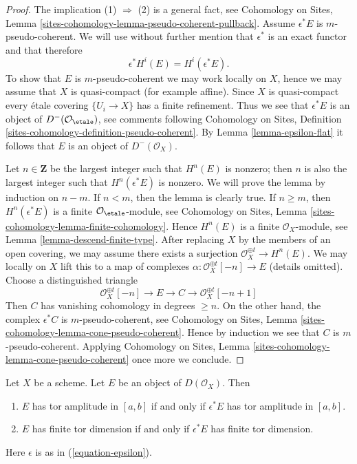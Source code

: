 \begin{proof}
The implication (1) $\Rightarrow$ (2) is a general fact, see
Cohomology on Sites, Lemma
\ref{sites-cohomology-lemma-pseudo-coherent-pullback}.
Assume $\epsilon^*E$ is $m$-pseudo-coherent.
We will use without further mention that $\epsilon^*$ is
an exact functor and that therefore
$$
\epsilon^*H^i(E) = H^i(\epsilon^*E).
$$
To show that $E$ is $m$-pseudo-coherent we may work locally on $X$,
hence we may assume that $X$ is quasi-compact (for example affine).
Since $X$ is quasi-compact every \'etale covering $\{U_i \to X\}$
has a finite refinement. Thus we see that $\epsilon^*E$ is
an object of $D^{-}(\mathcal{O}_\etale)$, see
comments following
Cohomology on Sites, Definition
\ref{sites-cohomology-definition-pseudo-coherent}.
By Lemma \ref{lemma-epsilon-flat} it follows that $E$ is an object of
$D^-(\mathcal{O}_X)$.

\medskip\noindent
Let $n \in \mathbf{Z}$ be the largest integer such that
$H^n(E)$ is nonzero; then $n$ is also the largest integer
such that $H^n(\epsilon^*E)$ is nonzero.
We will prove the lemma by induction on $n - m$.
If $n < m$, then the lemma is clearly true.
If $n \geq m$, then $H^n(\epsilon^*E)$ is a finite
$\mathcal{O}_\etale$-module, see
Cohomology on Sites, Lemma \ref{sites-cohomology-lemma-finite-cohomology}.
Hence $H^n(E)$ is a finite $\mathcal{O}_X$-module, see
Lemma \ref{lemma-descend-finite-type}.
After replacing $X$ by the members of an open covering, we may
assume there exists a surjection $\mathcal{O}_X^{\oplus t} \to H^n(E)$.
We may locally on $X$ lift this to a map of complexes
$\alpha : \mathcal{O}_X^{\oplus t}[-n] \to E$ (details omitted).
Choose a distinguished triangle
$$
\mathcal{O}_X^{\oplus t}[-n] \to E \to C \to \mathcal{O}_X^{\oplus t}[-n + 1]
$$
Then $C$ has vanishing cohomology in degrees $\geq n$. On the other hand, the
complex $\epsilon^*C$ is $m$-pseudo-coherent, see
Cohomology on Sites, Lemma \ref{sites-cohomology-lemma-cone-pseudo-coherent}.
Hence by induction we see that $C$ is $m$-pseudo-coherent. Applying
Cohomology on Sites, Lemma \ref{sites-cohomology-lemma-cone-pseudo-coherent}
once more we conclude.
\end{proof}

\begin{lemma}
\label{lemma-descend-tor-amplitude}
Let $X$ be a scheme. Let $E$ be an object of $D(\mathcal{O}_X)$.
Then
\begin{enumerate}
\item $E$ has tor amplitude in $[a, b]$ if and only if
$\epsilon^*E$ has tor amplitude in $[a, b]$.
\item $E$ has finite tor dimension if and only if $\epsilon^*E$ has finite
tor dimension.
\end{enumerate}
Here $\epsilon$ is as in (\ref{equation-epsilon}).
\end{lemma}

